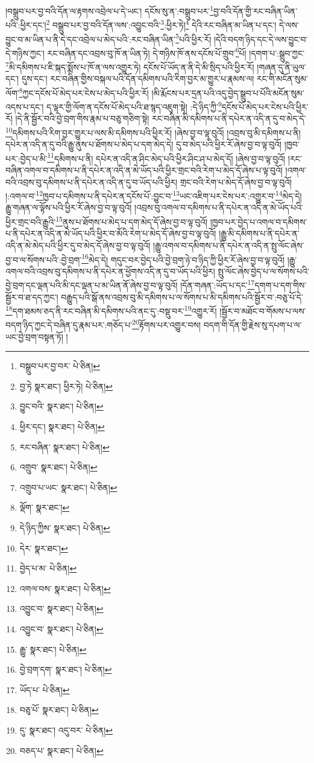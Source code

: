 །བསྒྲུབ་པར་བྱ་བའི་དོན་ལ་རྟགས་འབྲེལ་པ་དེ་ཡང་། དངོས་སུ་ན་:བསྒྲུབ་པར་\footnote{བསྒྲུབ་པར་བྱ་བར་  པེ་ཅིན། }བྱ་བའི་དོན་གྱི་རང་བཞིན་ཡིན་པའི་:ཕྱིར་དང་།\footnote{བྱ་ཏེ  སྣར་ཐང་། ཕྱིར་ཏེ།  པེ་ཅིན། } བསྒྲུབ་པར་བྱ་བའི་དོན་ལས་:འབྱུང་བའི་\footnote{བྱུང་བའི་  སྣར་ཐང་།  པེ་ཅིན། }:ཕྱིར་ཏེ།\footnote{ཕྱིར་དང་།  སྣར་ཐང་།  པེ་ཅིན། } དེའི་རང་བཞིན་མ་ཡིན་པ་དང་། དེ་ལས་བྱུང་བ་མ་ཡིན་པ་ནི་དེ་དང་འབྲེལ་པ་མེད་པའི་:རང་བཞིན་ཡིན་\footnote{རང་བཞིན་  སྣར་ཐང་།  པེ་ཅིན། }པའི་ཕྱིར་རོ། །དེའི་བདག་ཉིད་དང་དེ་ལས་བྱུང་བ་དེ་གཉིས་ཀྱང་། རང་བཞིན་དང་འབྲས་བུ་ཁོ་ན་ཡིན་ཏེ། དེ་གཉིས་ཁོ་ནས་དངོས་པོ་གྲུབ་\footnote{འགྲུབ་  སྣར་ཐང་།  པེ་ཅིན། }པོ། །དགག་པ་:སྒྲུབ་ཀྱང་\footnote{འགྲུབ་པ་ཡང་  སྣར་ཐང་།  པེ་ཅིན། }མི་དམིགས་པ་ཇི་སྐད་སྨོས་པ་ཁོ་ན་ལས་འགྱུར་ཏེ། དངོས་པོ་ཡོད་ན་ནི་དེ་མི་སྲིད་པའི་ཕྱིར་རོ། །གཞན་དུ་ནི་ཡུལ་དང་། དུས་དང་། རང་བཞིན་གྱིས་བསྐལ་པའི་དོན་དམིགས་པའི་རིག་བྱར་མ་གྱུར་པ་རྣམས་ལ། རང་གི་མངོན་སུམ་ལོག་\footnote{ལྡོག་  སྣར་ཐང་། }ཀྱང་དངོས་པོ་མེད་པར་ངེས་པ་མེད་པའི་ཕྱིར་རོ། །མི་རྨོངས་པར་དྲན་པའི་འདུ་བྱེད་སྒྲུབ་པ་པོའི་མངོན་སུམ་འདས་པ་དང་། ད་ལྟར་གྱི་ལོག་ན་དངོས་པོ་མེད་པའི་ཐ་སྙད་འཇུག་སྟེ། :དེ་ཉིད་ཀྱི་\footnote{དེ་ཉིད་ཀྱིས་  སྣར་ཐང་།  པེ་ཅིན། }དངོས་པོ་མེད་པར་ངེས་པའི་ཕྱིར་རོ། །དེ་ནི་སྦྱོར་བའི་བྱེ་བྲག་གིས་རྣམ་པ་བཅུ་གཅིག་སྟེ། རང་བཞིན་མི་དམིགས་པ་ནི་དཔེར་ན་འདི་ན་དུ་བ་མེད་དེ་\footnote{དེར་  སྣར་ཐང་། }དམིགས་པའི་རིག་བྱར་གྱུར་པ་ལས་མི་དམིགས་པའི་ཕྱིར་རོ། །ཞེས་བྱ་བ་ལྟ་བུའོ། །འབྲས་བུ་མི་དམིགས་པ་ནི། དཔེར་ན་འདི་ན་དུ་བའི་རྒྱུ་ནུས་པ་ཐོགས་པ་མེད་པ་དག་མེད་དེ། དུ་བ་མེད་པའི་ཕྱིར་རོ་ཞེས་བྱ་བ་ལྟ་བུའོ། །ཁྱབ་པར་:བྱེད་པ་མི་\footnote{བྱེད་པ་མ་  པེ་ཅིན། }དམིགས་པ་ནི། དཔེར་ན་འདི་ན་ཤིང་མེད་པའི་ཕྱིར་ཤིང་ཤ་པ་མེད་དོ། །ཞེས་བྱ་བ་ལྟ་བུའོ། །རང་བཞིན་འགལ་བ་དམིགས་པ་ནི་དཔེར་ན་འདི་ན་མེ་ཡོད་པའི་ཕྱིར་གྲང་བའི་རེག་པ་མེད་དོ་ཞེས་པ་ལྟ་བུའོ། །འགལ་བའི་འབྲས་བུ་དམིགས་པ་ནི་དཔེར་ན་འདི་ན་དུ་བ་ཡོད་པའི་ཕྱིར། གྲང་བའི་རེག་པ་མེད་དོ་ཞེས་བྱ་བ་ལྟ་བུའོ། །:འགལ་བ་\footnote{འགལ་བས་  སྣར་ཐང་།  པེ་ཅིན། }ཁྱབ་པ་དམིགས་པ་ནི་དཔེར་ན་དངོས་པོ་:བྱུང་བ་\footnote{འབྱུང་བ་  སྣར་ཐང་།  པེ་ཅིན། }ཡང་འཇིག་པར་ངེས་པར་:འགྱུར་བ་\footnote{འབྱུང་བ་  སྣར་ཐང་།  པེ་ཅིན། }མེད་དེ། རྒྱུ་གཞན་ལ་ལྟོས་པའི་ཕྱིར་རོ་ཞེས་བྱ་བ་ལྟ་བུའོ། །འབྲས་བུ་འགལ་བ་དམིགས་པ་ནི་དཔེར་ན་འདི་ན་མེ་ཡོད་པའི་ཕྱིར་གྲང་བའི་རྒྱུའི་\footnote{རྒྱུ་  སྣར་ཐང་།  པེ་ཅིན། }ནུས་པ་ཐོགས་པ་མེད་པ་དག་མེད་དོ་ཞེས་བྱ་བ་ལྟ་བུའོ། །ཁྱབ་པར་བྱེད་པ་འགལ་བ་དམིགས་པ་ནི་དཔེར་ན་འདི་ན་མེ་ཡོད་པའི་ཕྱིར་བ་མོའི་རེག་པ་མེད་དོ་ཞེས་བྱ་བ་ལྟ་བུའོ། །རྒྱུ་མི་དམིགས་པ་ནི་དཔེར་ན་འདི་ན་མེ་མེད་པའི་ཕྱིར་དུ་བ་མེད་དོ་ཞེས་བྱ་བ་ལྟ་བུའོ། །རྒྱུ་འགལ་བ་དམིགས་པ་ནི་དཔེར་ན་འདི་ན་སྤུ་ལོང་ཞེས་བྱ་བ་ལ་སོགས་པའི་:བྱེ་བྲག་\footnote{བྱེ་བྲག་དག་  སྣར་ཐང་།  པེ་ཅིན། }མེད་དེ། གདུང་བར་བྱེད་པའི་བྱེ་བྲག་ཉེ་བ་ཉིད་ཀྱི་ཕྱིར་རོ་ཞེས་བྱ་བ་ལྟ་བུའོ། །རྒྱུ་འགལ་བའི་འབྲས་བུ་དམིགས་པ་ནི་དཔེར་ན་ཕྱོགས་འདི་ན་དུ་བ་ཡོད་པའི་ཕྱིར། སྤུ་ལོང་ཞེས་བྱེད་པ་ལ་སོགས་པའི་བྱེ་བྲག་དང་ལྡན་པའི་མི་དང་ལྡན་པ་མ་ཡིན་ནོ་ཞེས་བྱ་བ་ལྟ་བུའོ། །དོན་གཞན་:ཡོད་པ་དང་\footnote{ཡོད་པ་  པེ་ཅིན། }དགག་པ་དག་གིས་སྦྱོར་བ་ཐ་དད་ཀྱང་། བརྒྱུད་པའི་སྒོ་ནས་འབྲས་བུ་མི་དམིགས་པ་ལ་སོགས་པ་མི་དམིགས་པའི་སྦྱོར་བ་:བཅུ་པོ་དེ་\footnote{བཅུ་པོ་  སྣར་ཐང་།  པེ་ཅིན། }དག་ཐམས་ཅད་ནི་རང་བཞིན་མི་དམིགས་པའི་ནང་དུ་:བསྡུ་བར་\footnote{དུ་  སྣར་ཐང་། འདུ་བར་  པེ་ཅིན། }འགྱུར་རོ། །སྦྱོར་བ་མཐོང་བ་གོམས་པ་ལས་བདག་ཉིད་ཀྱང་དེ་བཞིན་དུ་རྣམ་པར་:གཅོད་པ་\footnote{བཅད་པ་  སྣར་ཐང་།  པེ་ཅིན། }རྟོགས་པར་འགྱུར་བས། བདག་གི་དོན་གྱི་རྗེས་སུ་དཔག་པ་ལ་ཡང་བྱེ་བྲག་བསྟན་ཏོ། །
